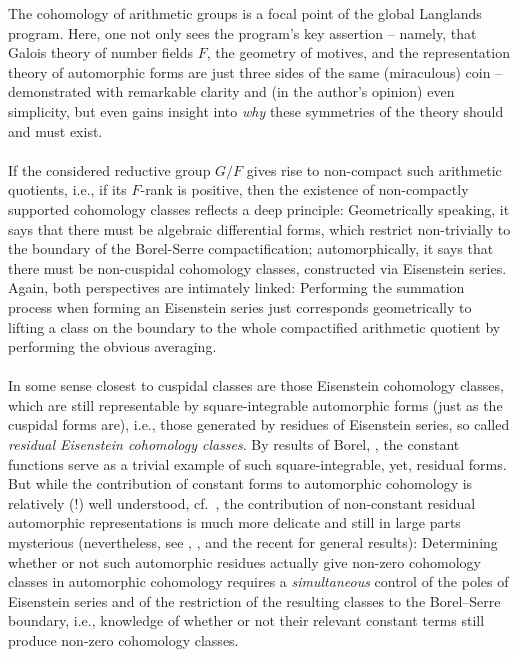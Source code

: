 \documentclass[a4paper,10pt]{amsart}
\theoremstyle{definition}
\numberwithin{equation}{section}
\begin{document}
\noindent The cohomology of arithmetic groups is a focal point of the global Langlands program. Here, one not only sees the program's key assertion -- namely, that Galois theory of number fields $F$, the geometry of motives, and the representation theory of automorphic forms are just three sides of the same (miraculous) coin -- demonstrated with remarkable clarity and (in the author's opinion) even simplicity, but even gains insight into {\it why} these symmetries of the theory should and must exist.\\\\
If the considered reductive group $G/F$ gives rise to non-compact such arithmetic quotients, i.e., if its $F$-rank is positive, then the existence of non-compactly supported cohomology classes reflects a deep principle: Geometrically speaking, it says that there must be algebraic differential forms, which restrict non-trivially to the boundary of the Borel-Serre compactification; automorphically, it says that there must be non-cuspidal cohomology classes, constructed via Eisenstein series. Again, both perspectives are intimately linked: Performing the summation process when forming an Eisenstein series just corresponds geometrically to lifting a class on the boundary to the whole compactified arithmetic quotient by performing the obvious averaging.\\\\ In some sense closest to cuspidal classes are those Eisenstein cohomology classes, which are still representable by square-integrable automorphic forms (just as the cuspidal forms are), i.e., those generated by residues of Eisenstein series, so called {\it residual Eisenstein cohomology classes}. By results of Borel, \cite{bor1}, the constant functions serve as a trivial example of such square-integrable, yet, residual forms. But while the contribution of constant forms to automorphic cohomology is relatively (!) well understood, cf.\ \cite{franke2}, the contribution of non-constant residual automorphic representations is much more delicate and still in large parts mysterious (nevertheless, see \cite{grob22}, \cite{rosp}, \cite{grobner-EisRes} and the recent \cite{mundy} for general results): Determining whether or not such automorphic residues actually give non-zero cohomology classes in automorphic cohomology requires a {\it simultaneous} control of the poles of Eisenstein series and of the restriction of the resulting classes to the Borel--Serre boundary, i.e., knowledge of whether or not their relevant constant terms still produce non-zero cohomology classes. \\\\
\end{document}
